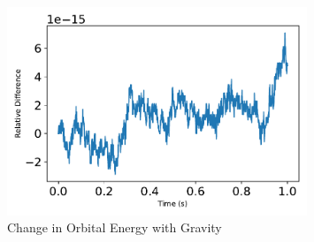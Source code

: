 \begin{figure}[htbp]\centerline{\includegraphics[width=0.8\textwidth]{AutoTeX/ChangeInOrbitalEnergy}}\caption{Change in Orbital Energy with Gravity}\label{fig:ChangeInOrbitalEnergy}\end{figure}